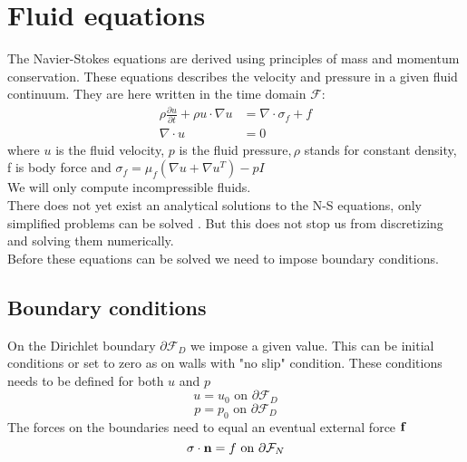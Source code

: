 \section{Fluid equations}
The Navier-Stokes equations are derived using principles of mass and momentum conservation. These equations describes the velocity and pressure in a given fluid continuum. They are here written in the time domain $\mathcal{F}$:
\begin{align}
\label{eq:NS}
\rho\frac{\partial u}{\partial t} + \rho u \cdot \nabla u &= \nabla \cdot \sigma_f + f \\
\nabla \cdot u &= 0
\end{align}
where $u$ is the fluid velocity, $p$ is the fluid pressure$, \rho$ stands for constant density, f is body force and $ \sigma_f = \mu_f (\nabla u + \nabla u^T)  - pI$ \\
We will only compute incompressible fluids. \\
There does not yet exist an analytical solutions to the N-S equations, only simplified problems can be solved \cite{White2000}. But this does not stop us from discretizing and solving them numerically. \\
Before these equations can be solved we need to impose boundary conditions.
\subsection*{Boundary conditions}
On the Dirichlet boundary $ \partial \mathcal{F}_D$ we impose a given value. This can be initial conditions or set to zero as on walls with "no slip" condition. These conditions needs to be defined for both $u$ and $p$
$$  u = u_0 \text{   on   } \partial \mathcal{F}_D  $$
$$  p = p_0 \text{   on   } \partial \mathcal{F}_D  $$
The forces on the boundaries need to equal an eventual external force $ \bold{f}$
$$ \sigma \cdot \bold{n} = f \text{   on   } \partial \mathcal{F}_N    $$







